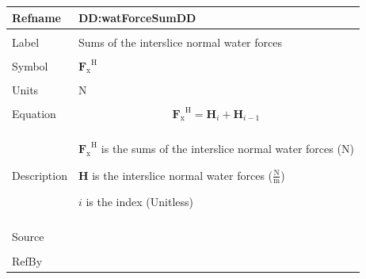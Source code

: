 \documentclass[12pt]{article}
\begin{document}
\vspace{\baselineskip}
\noindent
\begin{minipage}{\textwidth}
\begin{tabular}{>{\raggedright}p{}>{\raggedright\arraybackslash}p{}}
\toprule \textbf{Refname} & \textbf{DD:watForceSumDD}
\label{DD:watForceSumDD}
\\ \midrule \\
Label & Sums of the interslice normal water forces
        
\\ \midrule \\
Symbol & ${{\mathbf{F}_{\text{x}}}^{\text{H}}}$
         
\\ \midrule \\
Units & N
        
\\ \midrule \\
Equation & \begin{displaymath}
           {{\mathbf{F}_{\text{x}}}^{\text{H}}}={\mathbf{H}}_{i}+{\mathbf{H}}_{i-1}
           \end{displaymath}
\\ \midrule \\
Description & \begin{symbDescription}
              \item{${{\mathbf{F}_{\text{x}}}^{\text{H}}}$ is the sums of the interslice normal water forces (N)}
              \item{$\mathbf{H}$ is the interslice normal water forces ($\frac{\text{N}}{\text{m}}$)}
              \item{$i$ is the index (Unitless)}
              \end{symbDescription}
\\ \midrule \\
Source & \cite{fredlund1977}
         
\\ \midrule \\
RefBy & 
\\ \bottomrule
\end{tabular}
\end{minipage}
\end{document}

